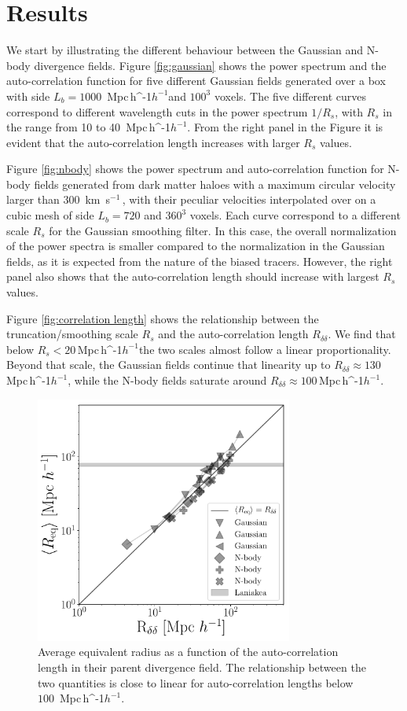 \documentclass[usenatbib]{mnras}
\newcommand{\Mpch}{\,{\rm Mpc}\,\ifmmode h^{-1}\else $h^{-1}$\fi}
\newcommand{\kms}{\,{\rm km}\ s$^{-1}$\,}
\begin{document}
\section{Results}
\label{sec:results}

We start by illustrating the different behaviour between the Gaussian and N-body divergence fields.
Figure \ref{fig:gaussian} shows the power spectrum and the auto-correlation function for five different Gaussian fields generated over a box with side $L_b=1000$ \Mpch and $100^3$ voxels.
The five different curves correspond to different wavelength cuts in the power spectrum  $1/R_s$, with $R_s$ in the range from 10 to 40 \Mpch.
From the right panel in the Figure it is evident that the auto-correlation length increases with larger $R_{s}$ values.

Figure \ref{fig:nbody} shows the power spectrum and auto-correlation function for N-body fields generated 
from dark matter haloes with a maximum circular velocity larger than $300$ \kms, with their peculiar velocities interpolated over on a cubic mesh of side $L_b=720$ \hMpc and  $360^3$ voxels.
Each curve correspond to a different scale $R_s$ for the Gaussian smoothing filter.
In this case, the overall normalization of the power spectra is smaller compared to the normalization in the Gaussian fields, as it is expected from the nature of the biased tracers.
However, the right panel also shows that the auto-correlation length should increase with largest $R_{s}$ values.

Figure \ref{fig:correlation length} shows the relationship between the truncation/smoothing scale $R_s$ and the auto-correlation length $R_{\delta\delta}$.
We find that below $R_{s} < 20$\Mpch the two scales almost follow a linear proportionality.
Beyond that scale, the Gaussian fields continue that linearity up to $R_{\delta\delta}\approx 130$\Mpch, while the N-body fields saturate around $R_{\delta\delta}\approx 100$\Mpch.


\begin{figure}
    \centering
    \includegraphics[width=240pt]{summary_watershed.pdf}
    \caption{Average equivalent radius as a function of the auto-correlation length in their parent divergence field.
    The relationship between the two quantities is close to linear for auto-correlation lengths below $100$ \Mpch. \label{fig:money_plot}}
\end{figure}
\end{document}
